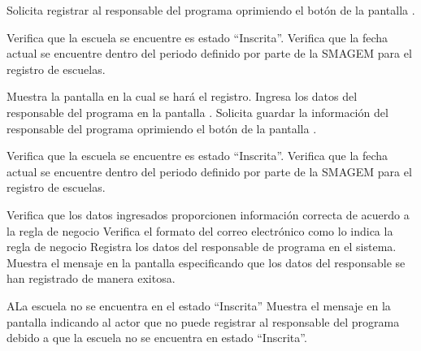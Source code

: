  \begin{UCtrayectoria}
    \UCpaso[\UCactor] Solicita registrar al responsable del programa oprimiendo el botón  de la pantalla .
    
    \UCpaso[\UCsist] Verifica que la escuela se encuentre es estado ``Inscrita''. 
    \UCpaso[\UCsist] Verifica que la fecha actual se encuentre dentro del periodo definido por parte de la SMAGEM para el registro de escuelas.     

    \UCpaso[\UCsist] Muestra la pantalla  en la cual se hará el registro.
    \UCpaso[\UCactor] Ingresa los datos del responsable del programa en la pantalla .\label{cur10:Acciones}
    \UCpaso[\UCactor] Solicita guardar la información del responsable del programa oprimiendo el botón  de la pantalla .

    \UCpaso[\UCsist] Verifica que la escuela se encuentre es estado ``Inscrita''. 
    \UCpaso[\UCsist] Verifica que la fecha actual se encuentre dentro del periodo definido por parte de la SMAGEM para el registro de escuelas.     
    
    
    \UCpaso[\UCsist] Verifica que los datos ingresados proporcionen información correcta de acuerdo a la regla de negocio    
   \UCpaso[\UCsist]Verifica el formato del correo electrónico como lo indica la regla de negocio   %
    \UCpaso[\UCsist] Registra los datos del responsable de programa en el sistema.
    \UCpaso[\UCsist] Muestra el mensaje  en la pantalla  especificando que los datos del responsable se han registrado de manera exitosa.
 \end{UCtrayectoria}


 \begin{UCtrayectoriaA}{A}{La escuela no se encuentra en el estado ``Inscrita''}
    \UCpaso[\UCsist] Muestra el mensaje  en la pantalla  indicando al actor que no puede registrar al responsable del programa debido a que la escuela no se encuentra en estado ``Inscrita''.
 \end{UCtrayectoriaA}

